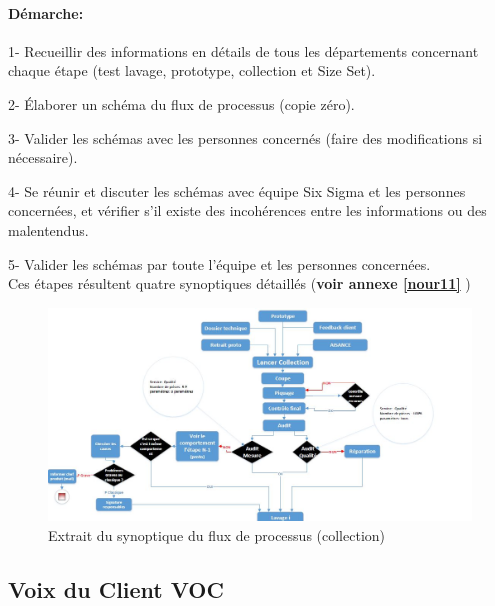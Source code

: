 \documentclass[12pt, a4paper]{thesis}
\begin{document}
\paragraph*{Démarche:}
\item 1- Recueillir des informations en détails de tous les départements concernant chaque étape (test lavage, prototype, collection et Size Set).
\item 2- Élaborer un schéma du flux de processus (copie zéro).
\item 3- Valider les schémas avec les personnes concernés (faire des modifications si nécessaire).
\item 4- Se réunir et discuter les schémas avec équipe Six Sigma et les personnes concernées, et vérifier s'il existe des incohérences entre les informations ou des malentendus.
\item 5- Valider les schémas par toute l'équipe et les personnes concernées.\\
Ces étapes résultent quatre synoptiques détaillés (\textbf{voir annexe \ref{nour11} }) 
\begin{figure}[!h]
\begin{center}
     \includegraphics[scale=0.65]{coll.JPG}
     
        \caption{Extrait du synoptique du flux de processus (collection) }
\end{center}
\end{figure}

















\subsection{Voix du Client VOC}
\end{document}
